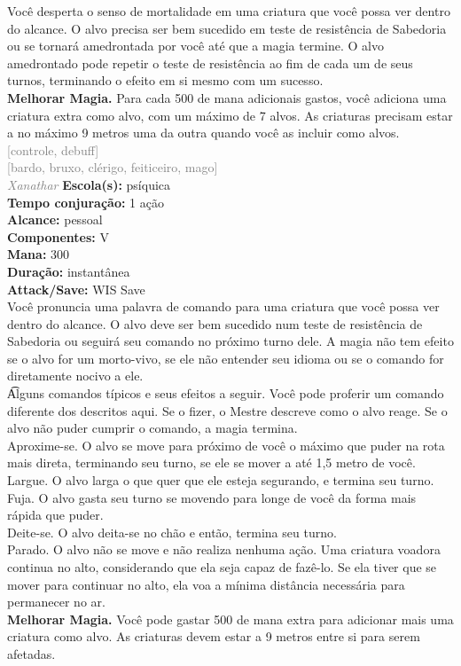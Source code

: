 \documentclass{RPG_Adventure}[2021/10/20]
\begin{document}
{\normalsize Você desperta o senso de mortalidade em uma criatura que você possa ver dentro do alcance. O alvo precisa ser bem sucedido em teste de resistência de Sabedoria ou se tornará amedrontada por você até que a magia termine. O alvo amedrontado pode repetir o teste de resistência ao fim de cada um de seus turnos, terminando o efeito em si mesmo com um sucesso.\\\t \textbf{Melhorar Magia.} Para cada 500 de mana adicionais gastos, você adiciona uma criatura extra como alvo, com um máximo de 7 alvos. As criaturas precisam estar a no máximo 9 metros uma da outra quando você as incluir como alvos.\\}
{\scriptsize \textcolor{gray}{[controle, debuff]\\}}
{\scriptsize \textcolor{gray}{[bardo, bruxo, clérigo, feiticeiro, mago]\\}}
{\tiny \textcolor{gray}{\textit{Xanathar}}}
{\small \t \textbf{Escola(s):} psíquica\\\t \textbf{Tempo conjuração:} 1 ação\\\t \textbf{Alcance:} pessoal\\\t \textbf{Componentes:} V\\\t \textbf{Mana:} 300\\\t \textbf{Duração:} instantânea\\\t \textbf{Attack/Save:} WIS Save\\}
{\normalsize Você pronuncia uma palavra de comando para uma criatura que você possa ver dentro do alcance. O alvo deve ser bem sucedido num teste de resistência de Sabedoria ou seguirá seu comando no próximo turno dele. A magia não tem efeito se o alvo for um morto-vivo, se ele não entender seu idioma ou se o comando for diretamente nocivo a ele.\\\t Alguns comandos típicos e seus efeitos a seguir. Você pode proferir um comando diferente dos descritos aqui. Se o fizer, o Mestre descreve como o alvo reage. Se o alvo não puder cumprir o comando, a magia termina. \\\t \textit{}Aproxime-se.\textit{} O alvo se move para próximo de você o máximo que puder na rota mais direta, terminando seu turno, se ele se mover a até 1,5 metro de você.\\\t \textit{}Largue.\textit{} O alvo larga o que quer que ele esteja segurando, e termina seu turno.\\\t \textit{}Fuja.\textit{} O alvo gasta seu turno se movendo para longe de você da forma mais rápida que puder.\\\t \textit{}Deite-se.\textit{} O alvo deita-se no chão e então, termina seu turno.\\\t \textit{}Parado.\textit{} O alvo não se move e não realiza nenhuma ação. Uma criatura voadora continua no alto, considerando que ela seja capaz de fazê-lo. Se ela tiver que se mover para continuar no alto, ela voa a mínima distância necessária para permanecer no ar.\\\t \textbf{Melhorar Magia.} Você pode gastar 500 de mana extra para adicionar mais uma criatura como alvo. As criaturas devem estar a 9 metros entre si para serem afetadas.\\}
\end{document}
